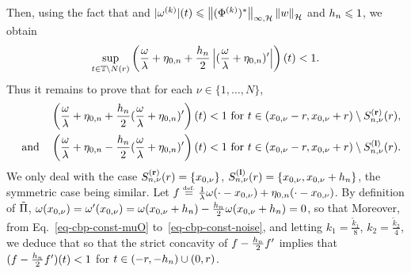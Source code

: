 Then, using the fact that and $|\omega^{(k)}|(t)\leqslant \left\lVert (\Phi^{(k)})^* \right\rVert_{\infty,\mathcal{H}}\left\lVert w \right\rVert_{\mathcal{H}}$ and  ${h_n}\leqslant 1$, we obtain
\begin{align*}
  \sup_{t\in \mathbb{T}\setminus N(r)} \left(\frac{\omega}{\lambda} + \eta_{0,n} + \frac{{h_n}}{2}\left|(\frac{\omega}{\lambda} + \eta_{0,n})'\right|\right)(t)<1.
\end{align*}
Thus it remains to prove that for each $\nu\in\{1,\ldots, N\}$, 
\begin{align}
  \left(\frac{\omega}{\lambda} + \eta_{0,n} + \frac{{h_n}}{2}(\frac{\omega}{\lambda} + \eta_{0,n})'\right)(t)<1 \mbox{ for } t \in (x_{0,\nu}-r,x_{0,\nu}+r)\setminus S_{n,\nu}^{\mathbf{(r)}}(r),\label{eq-cbp-const-sat1}\\
\quad \text{and} \quad \left(\frac{\omega}{\lambda} + \eta_{0,n} - \frac{{h_n}}{2}(\frac{\omega}{\lambda} + \eta_{0,n})'\right)(t)<1 \mbox{ for } t \in (x_{0,\nu}-r,x_{0,\nu}+r)\setminus S_{n,\nu}^{\mathbf{(l)}}(r)\label{eq-cbp-const-sat2}.
\end{align} 
We only deal with the case  $S_{n,\nu}^{\mathbf{(r)}}(r)=\{x_{0,\nu} \}$, $S_{n,\nu}^{\mathbf{(l)}}(r)=\{x_{0,\nu},x_{0,\nu}+{h_n}\}$, the symmetric case being similar. 
Let $f\stackrel{\mbox{\upshape\tiny def.}}{=} \frac{1}{\lambda}\omega(\cdot-x_{0,\nu})+\eta_{0,n}(\cdot-x_{0,\nu})$. By definition of $\tilde{\Pi}$, $\omega(x_{0,\nu})=\omega'(x_{0,\nu})=\omega(x_{0,\nu}+{h_n})-\frac{{h_n}}{2}\omega(x_{0,\nu}+{h_n})=0$, so that
Moreover, from Eq.~\eqref{eq-cbp-const-muO} to~\eqref{eq-cbp-const-noise}, and letting $k_1=\frac{\tilde{k}_1}{8}$, $k_2=\frac{\tilde{k}_2}{4}$, we deduce that 
so that the strict concavity of $f-\frac{{h_n}}{2} f'$ implies that $(f-\frac{{h_n}}{2} f')(t)<1$ for $t\in (-r,-{h_n})\cup (0,r)$.

